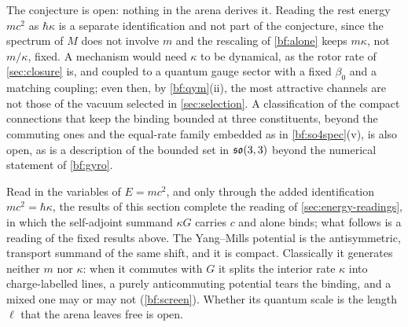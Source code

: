 The conjecture is open: nothing in the arena derives it. Reading the rest energy $mc^2$ as $\hbar\kappa$ is a separate identification and not part of
the conjecture, since the spectrum of $M$ does not involve $m$ and the rescaling of \cref{bf:alone} keeps $m\kappa$, not $m/\kappa$, fixed. A
mechanism would need $\kappa$ to be dynamical, as the rotor rate of \cref{sec:closure} is, and coupled to a quantum gauge sector with a fixed
$\beta_0$ and a matching coupling; even then, by \cref{bf:qym}(ii), the most attractive channels are not those of the vacuum selected in
\cref{sec:selection}. A classification of the compact connections that keep the binding bounded at three constituents, beyond the commuting ones and the equal-rate
family embedded as in \cref{bf:so4spec}(v), is also open, as is a description of the bounded set in $\mathfrak{so}(3,3)$ beyond the numerical statement of
\cref{bf:gyro}.

Read in the variables of $E=mc^2$, and only through the added identification $mc^2=\hbar\kappa$, the results of this section complete the reading
of \cref{sec:energy-readings}, in which the self-adjoint summand $\kappa G$ carries $c$ and alone binds; what follows is a reading of the fixed
results above. The Yang--Mills potential is the antisymmetric, transport summand of the same shift, and it is compact. Classically it generates neither $m$ nor $\kappa$: when it commutes with $G$ it splits the interior rate $\kappa$
into charge-labelled lines, a purely anticommuting potential tears the binding, and a mixed one may or may not (\cref{bf:screen}). Whether
its quantum scale is the length $\ell$ that the arena leaves free is open.
